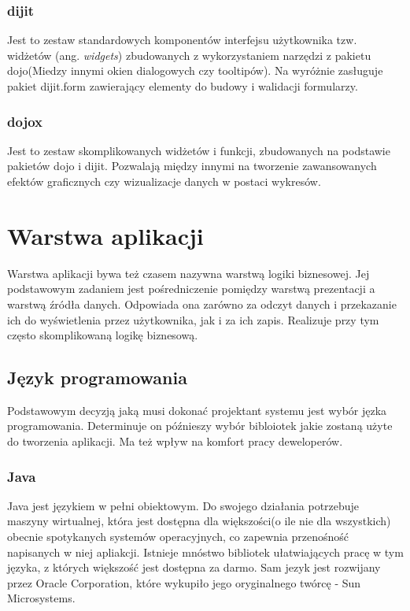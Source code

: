 \subsubsection[dijit][dijit]{dijit}
Jest to zestaw standardowych komponentów interfejsu użytkownika tzw. widżetów (ang. \textit{widgets}) zbudowanych z wykorzystaniem narzędzi z pakietu dojo(Miedzy innymi okien dialogowych czy tooltipów). Na wyróżnie zasługuje pakiet dijit.form zawierający elementy do budowy i walidacji formularzy.
 
\subsubsection[dojox][dojox]{dojox}
Jest to zestaw skomplikowanych widżetów i funkcji, zbudowanych na podstawie pakietów dojo i dijit. Pozwalają między innymi na tworzenie zawansowanych efektów graficznych czy wizualizacje danych w postaci wykresów.
 
\section[Warstwa aplikacji][Warstwa aplikacji]{Warstwa aplikacji}
Warstwa aplikacji bywa też czasem nazywna warstwą logiki biznesowej. Jej podstawowym zadaniem jest pośredniczenie pomiędzy warstwą prezentacji a warstwą źródła danych. Odpowiada ona zarówno za odczyt danych i przekazanie ich do wyświetlenia przez użytkownika, jak i za ich zapis. Realizuje przy tym często skomplikowaną logikę biznesową.

\subsection[Język programowania][Język programowania]{Język programowania}
Podstawowym decyzją jaką musi dokonać projektant systemu jest wybór jęzka programowania. Determinuje on późnieszy wybór bibloiotek jakie zostaną użyte do tworzenia aplikacji. Ma też wpływ na komfort pracy deweloperów.

\subsubsection{Java}
Java jest językiem w pełni obiektowym. Do swojego działania potrzebuje maszyny wirtualnej, która jest dostępna dla większości(o ile nie dla wszystkich) obecnie spotykanych systemów operacyjnych, co zapewnia przenośność napisanych w niej apliakcji. Istnieje mnóstwo bibliotek ułatwiających pracę w tym języka, z których większość jest dostępna za darmo. Sam jezyk jest rozwijany przez Oracle Corporation, które wykupiło jego oryginalnego twórcę - Sun Microsystems.


